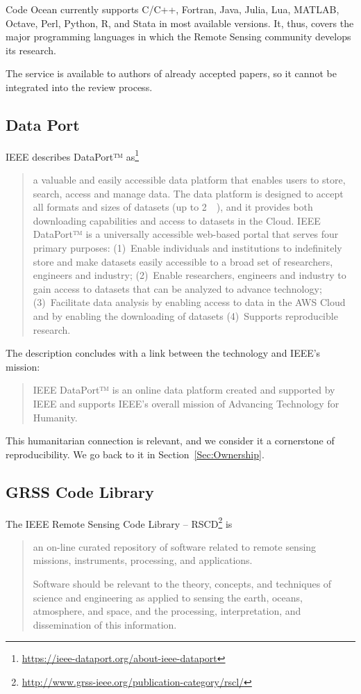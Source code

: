 \documentclass[journal,twoside]{IEEEtran}
\begin{document}
Code Ocean currently supports 
C/C++, 
Fortran,
Java,
Julia,
Lua,
MATLAB,
Octave,
Perl,
Python,
R, and
Stata in most available versions.
It, thus, covers the major programming languages in which the Remote Sensing community develops its research.

The service is available to authors of already accepted papers, so it cannot be integrated into the review process.

\subsection{Data Port}

IEEE describes DataPort™ as\footnote{\url{https://ieee-dataport.org/about-ieee-dataport}} 
\begin{quote}
	a valuable and easily accessible data platform that enables users to store, search, access and manage data.  
	The data platform is designed to accept all formats and sizes of datasets (up to \SI{2}{\tera\byte}), and it provides both downloading capabilities and access to datasets in the Cloud.  
	IEEE DataPort™ is a universally accessible web-based portal that serves four primary purposes: 
	(1)~Enable individuals and institutions to indefinitely store and make datasets easily accessible to a broad set of researchers, engineers and industry;  
	(2)~Enable researchers, engineers and industry to gain access to datasets that can be analyzed to advance technology;
	(3)~Facilitate data analysis by enabling access to data in the AWS Cloud and by enabling the downloading of datasets
	(4)~Supports reproducible research.
\end{quote}

The description concludes with a link between the technology and IEEE's mission:
\begin{quote}
	IEEE DataPort™ is an online data platform created and supported by IEEE and supports IEEE’s overall mission of Advancing Technology for Humanity.  
\end{quote}
This humanitarian connection is relevant, and we consider it a cornerstone of reproducibility.
We go back to it in Section~\ref{Sec:Ownership}.


\subsection{GRSS Code Library}

The IEEE Remote Sensing Code Library -- RSCD\footnote{\url{http://www.grss-ieee.org/publication-category/rscl/}} is 
\begin{quote}
	an on-line curated repository of software related to remote sensing missions, instruments, processing, and applications.
	
	Software should be relevant to the theory, concepts, and techniques of science and engineering as applied to sensing the earth, oceans, atmosphere, and space, and the processing, interpretation, and dissemination of this information.
\end{quote}
\end{document}
